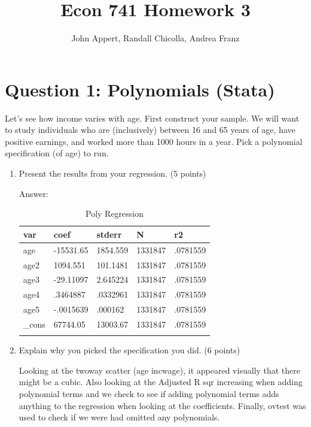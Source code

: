 \documentclass{article}
\begin{document}
\title{Econ 741 Homework 3}
\author{John Appert, Randall Chicolla, Andrea Franz}
\maketitle

\section{Question 1:  Polynomials (Stata)}
Let’s see how income varies with age. First construct your sample. We will want to
study individuals who are (inclusively) between 16 and 65 years of age, have positive earnings, and worked more than 1000 hours in a year. Pick a polynomial specification (of age) to run.

\begin{enumerate}[label=\alph*]
\item Present the results from your regression.  (5 points)

Answer:\\

\begin{table}[tbp] \centering
{}

\caption{Poly Regression}
\begin{tabularx}{\textwidth}{lCCCC}

\toprule
{var}&{coef}&{stderr}&{N}&{r2} \tabularnewline
\midrule\addlinespace[1.5ex]
age&-15531.65&1854.559&1331847&.0781559 \tabularnewline
age2&1094.551&101.1481&1331847&.0781559 \tabularnewline
age3&-29.11097&2.645224&1331847&.0781559 \tabularnewline
age4&.3464887&.0332961&1331847&.0781559 \tabularnewline
age5&-.0015639&.000162&1331847&.0781559 \tabularnewline
\_cons&67744.05&13003.67&1331847&.0781559 \tabularnewline
\bottomrule \addlinespace[1.5ex]

\end{tabularx}
\end{table}


\item Explain why you picked the specification you did.  (6 points)

Looking at the twoway scatter (age incwage), it appeared visually that there might be a cubic. Also looking at the Adjusted R sqr increasing when adding polynomial terms and we check to see if adding polynomial terms adds anything to the regression when looking at the coefficients. Finally, ovtest was used to check if we were had omitted any polynomials.


\end{enumerate}
\end{document}
